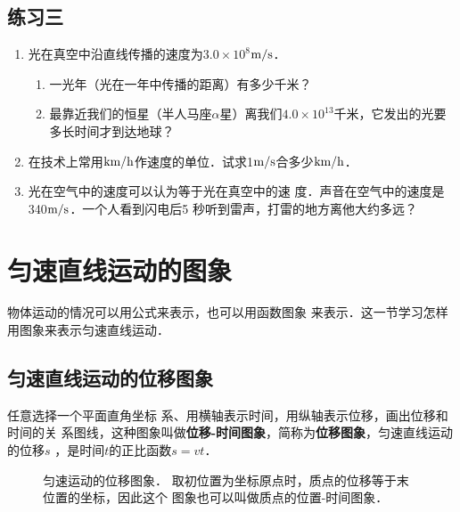 \subsection*{练习三}

\begin{enumerate}
    \item 光在真空中沿直线传播的速度为$3.0\times 10^8$$\text{m}/\text{s}$．
\begin{enumerate}
    \item 一光年（光在一年中传播的距离）有多少千米？
    \item 最靠近我们的恒星（半人马座$\alpha$星）离我们$4.0\times 10^{13}$千米，它发出的光要多长时间才到达地球？
\end{enumerate}    
\item  在技术上常用$\text{km}/\text{h}$作速度的单位．试求1$\text{m}/\text{s}$合多少$\text{km}/\text{h}$．
\item 光在空气中的速度可以认为等于光在真空中的速
度．声音在空气中的速度是340$\text{m}/\text{s}$．一个人看到闪电后5
秒听到雷声，打雷的地方离他大约多远？

\end{enumerate}

\section{匀速直线运动的图象}
    物体运动的情况可以用公式来表示，也可以用函数图象
来表示．这一节学习怎样用图象来表示匀速直线运动．

    \subsection{匀速直线运动的位移图象} 
    
    任意选择一个平面直角坐标
系、用横轴表示时间，用纵轴表示位移，画出位移和时间的关
系图线，这种图象叫做\textbf{位移-时间图象}，简称为\textbf{位移图象}，匀速直线运动的位移$s$
，是时间$t$的正比函数$s=vt$．
\begin{figure}[htp]
    \centering
    \caption{匀速运动的位移图象．
    取初位置为坐标原点时，质点的位移等于末位置的坐标，因此这个
    图象也可以叫做质点的位置-时间图象．}
    \end{figure}

